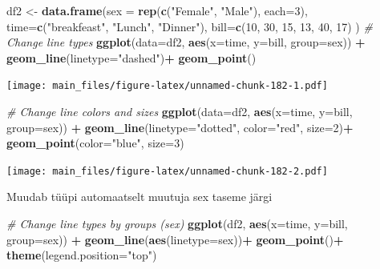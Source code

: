 \documentclass[]{book}
\newenvironment{Shaded}{\begin{snugshade}}{\end{snugshade}}
\newcommand{\KeywordTok}[1]{\textcolor[rgb]{0.13,0.29,0.53}{\textbf{#1}}}
\newcommand{\DataTypeTok}[1]{\textcolor[rgb]{0.13,0.29,0.53}{#1}}
\newcommand{\DecValTok}[1]{\textcolor[rgb]{0.00,0.00,0.81}{#1}}
\newcommand{\StringTok}[1]{\textcolor[rgb]{0.31,0.60,0.02}{#1}}
\newcommand{\CommentTok}[1]{\textcolor[rgb]{0.56,0.35,0.01}{\textit{#1}}}
\newcommand{\OperatorTok}[1]{\textcolor[rgb]{0.81,0.36,0.00}{\textbf{#1}}}
\newcommand{\NormalTok}[1]{#1}
\begin{document}
\begin{Shaded}
\begin{Highlighting}[]
\NormalTok{df2 <-}\StringTok{ }\KeywordTok{data.frame}\NormalTok{(}\DataTypeTok{sex =} \KeywordTok{rep}\NormalTok{(}\KeywordTok{c}\NormalTok{(}\StringTok{"Female"}\NormalTok{, }\StringTok{"Male"}\NormalTok{), }\DataTypeTok{each=}\DecValTok{3}\NormalTok{),}
                  \DataTypeTok{time=}\KeywordTok{c}\NormalTok{(}\StringTok{"breakfeast"}\NormalTok{, }\StringTok{"Lunch"}\NormalTok{, }\StringTok{"Dinner"}\NormalTok{),}
                  \DataTypeTok{bill=}\KeywordTok{c}\NormalTok{(}\DecValTok{10}\NormalTok{, }\DecValTok{30}\NormalTok{, }\DecValTok{15}\NormalTok{, }\DecValTok{13}\NormalTok{, }\DecValTok{40}\NormalTok{, }\DecValTok{17}\NormalTok{) )}
\CommentTok{# Change line types}
\KeywordTok{ggplot}\NormalTok{(}\DataTypeTok{data=}\NormalTok{df2, }\KeywordTok{aes}\NormalTok{(}\DataTypeTok{x=}\NormalTok{time, }\DataTypeTok{y=}\NormalTok{bill, }\DataTypeTok{group=}\NormalTok{sex)) }\OperatorTok{+}
\StringTok{  }\KeywordTok{geom_line}\NormalTok{(}\DataTypeTok{linetype=}\StringTok{"dashed"}\NormalTok{)}\OperatorTok{+}
\StringTok{  }\KeywordTok{geom_point}\NormalTok{()}
\end{Highlighting}
\end{Shaded}

\texttt{[image: main\_files/figure-latex/unnamed-chunk-182-1.pdf]}

\begin{Shaded}
\begin{Highlighting}[]
\CommentTok{# Change line colors and sizes}
\KeywordTok{ggplot}\NormalTok{(}\DataTypeTok{data=}\NormalTok{df2, }\KeywordTok{aes}\NormalTok{(}\DataTypeTok{x=}\NormalTok{time, }\DataTypeTok{y=}\NormalTok{bill, }\DataTypeTok{group=}\NormalTok{sex)) }\OperatorTok{+}
\StringTok{  }\KeywordTok{geom_line}\NormalTok{(}\DataTypeTok{linetype=}\StringTok{"dotted"}\NormalTok{, }\DataTypeTok{color=}\StringTok{"red"}\NormalTok{, }\DataTypeTok{size=}\DecValTok{2}\NormalTok{)}\OperatorTok{+}
\StringTok{  }\KeywordTok{geom_point}\NormalTok{(}\DataTypeTok{color=}\StringTok{"blue"}\NormalTok{, }\DataTypeTok{size=}\DecValTok{3}\NormalTok{)}
\end{Highlighting}
\end{Shaded}

\texttt{[image: main\_files/figure-latex/unnamed-chunk-182-2.pdf]}

Muudab tüüpi automaatselt muutuja sex taseme järgi

\begin{Shaded}
\begin{Highlighting}[]
\CommentTok{# Change line types by groups (sex)}
\KeywordTok{ggplot}\NormalTok{(df2, }\KeywordTok{aes}\NormalTok{(}\DataTypeTok{x=}\NormalTok{time, }\DataTypeTok{y=}\NormalTok{bill, }\DataTypeTok{group=}\NormalTok{sex)) }\OperatorTok{+}
\StringTok{  }\KeywordTok{geom_line}\NormalTok{(}\KeywordTok{aes}\NormalTok{(}\DataTypeTok{linetype=}\NormalTok{sex))}\OperatorTok{+}
\StringTok{  }\KeywordTok{geom_point}\NormalTok{()}\OperatorTok{+}
\StringTok{  }\KeywordTok{theme}\NormalTok{(}\DataTypeTok{legend.position=}\StringTok{"top"}\NormalTok{)}
\end{Highlighting}
\end{Shaded}
\end{document}
